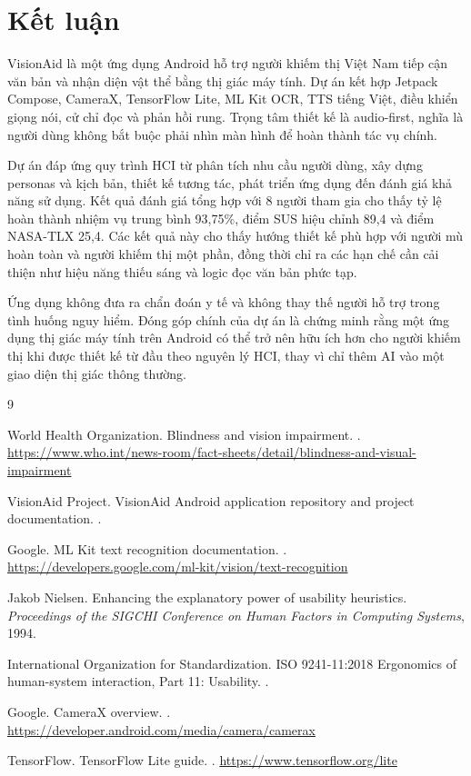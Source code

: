 \documentclass[a4paper,13pt]{report}
\begin{document}
\chapter{Kết luận}

VisionAid là một ứng dụng Android hỗ trợ người khiếm thị Việt Nam tiếp cận văn bản và nhận diện vật thể bằng thị giác máy tính. Dự án kết hợp Jetpack Compose, CameraX, TensorFlow Lite, ML Kit OCR, TTS tiếng Việt, điều khiển giọng nói, cử chỉ đọc và phản hồi rung. Trọng tâm thiết kế là audio-first, nghĩa là người dùng không bắt buộc phải nhìn màn hình để hoàn thành tác vụ chính.

Dự án đáp ứng quy trình HCI từ phân tích nhu cầu người dùng, xây dựng personas và kịch bản, thiết kế tương tác, phát triển ứng dụng đến đánh giá khả năng sử dụng. Kết quả đánh giá tổng hợp với 8 người tham gia cho thấy tỷ lệ hoàn thành nhiệm vụ trung bình 93,75\%, điểm SUS hiệu chỉnh 89,4 và điểm NASA-TLX 25,4. Các kết quả này cho thấy hướng thiết kế phù hợp với người mù hoàn toàn và người khiếm thị một phần, đồng thời chỉ ra các hạn chế cần cải thiện như hiệu năng thiếu sáng và logic đọc văn bản phức tạp.

Ứng dụng không đưa ra chẩn đoán y tế và không thay thế người hỗ trợ trong tình huống nguy hiểm. Đóng góp chính của dự án là chứng minh rằng một ứng dụng thị giác máy tính trên Android có thể trở nên hữu ích hơn cho người khiếm thị khi được thiết kế từ đầu theo nguyên lý HCI, thay vì chỉ thêm AI vào một giao diện thị giác thông thường.

{}
\begin{thebibliography}{9}

World Health Organization.
\newblock Blindness and vision impairment.
.
\newblock \url{https://www.who.int/news-room/fact-sheets/detail/blindness-and-visual-impairment}

VisionAid Project.
\newblock VisionAid Android application repository and project documentation.
.

Google.
\newblock ML Kit text recognition documentation.
.
\newblock \url{https://developers.google.com/ml-kit/vision/text-recognition}

Jakob Nielsen.
\newblock Enhancing the explanatory power of usability heuristics.
\newblock \textit{Proceedings of the SIGCHI Conference on Human Factors in Computing Systems}, 1994.

International Organization for Standardization.
\newblock ISO 9241-11:2018 Ergonomics of human-system interaction, Part 11: Usability.
.

Google.
\newblock CameraX overview.
.
\newblock \url{https://developer.android.com/media/camera/camerax}

TensorFlow.
\newblock TensorFlow Lite guide.
.
\newblock \url{https://www.tensorflow.org/lite}

\end{thebibliography}
\end{document}
